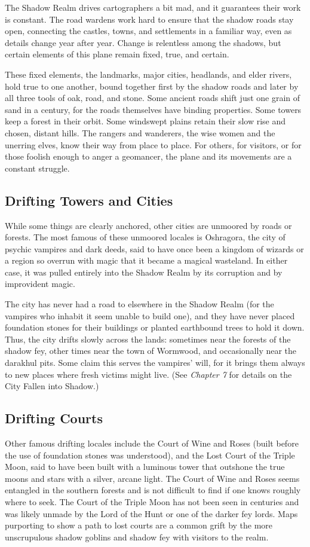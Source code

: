 \documentclass[10pt,a4paper,twoside,bg=print,twocolumn,openany,nodeprecatedcode]{dndbook}
\begin{document}
The Shadow Realm drives cartographers a bit mad, and it guarantees their work is constant. The road wardens work hard to ensure that the shadow roads stay open, connecting the castles, towns, and settlements in a familiar way, even as details change year after year. Change is relentless among the shadows, but certain elements of this plane remain fixed, true, and certain.

These fixed elements, the landmarks, major cities, headlands, and elder rivers, hold true to one another, bound together first by the shadow roads and later by all three tools of oak, road, and stone. Some ancient roads shift just one grain of sand in a century, for the roads themselves have binding properties. Some towers keep a forest in their orbit. Some windswept plains retain their slow rise and chosen, distant hills. The rangers and wanderers, the wise women and the unerring elves, know their way from place to place. For others, for visitors, or for those foolish enough to anger a geomancer, the plane and its movements are a constant struggle.

\subsection{Drifting Towers and Cities}
While some things are clearly anchored, other cities are unmoored by roads or forests. The most famous of these unmoored locales is Oshragora, the city of psychic vampires and dark deeds, said to have once been a kingdom of wizards or a region so overrun with magic that it became a magical wasteland. In either case, it was pulled entirely into the Shadow Realm by its corruption and by improvident magic.

The city has never had a road to elsewhere in the Shadow Realm (for the vampires who inhabit it seem unable to build one), and they have never placed foundation stones for their buildings or planted earthbound trees to hold it down. Thus, the city drifts slowly across the lands: sometimes near the forests of the shadow fey, other times near the town of Wormwood, and occasionally near the darakhul pits. Some claim this serves the vampires' will, for it brings them always to new places where fresh victims might live. (See \textit{Chapter 7} for details on the City Fallen into Shadow.)

\subsection{Drifting Courts}
Other famous drifting locales include the Court of Wine and Roses (built before the use of foundation stones was understood), and the Lost Court of the Triple Moon, said to have been built with a luminous tower that outshone the true moons and stars with a silver, arcane light. The Court of Wine and Roses seems entangled in the southern forests and is not difficult to find if one knows roughly where to seek. The Court of the Triple Moon has not been seen in centuries and was likely unmade by the Lord of the Hunt or one of the darker fey lords. Maps purporting to show a path to lost courts are a common grift by the more unscrupulous shadow goblins and shadow fey with visitors to the realm.
\end{document}
